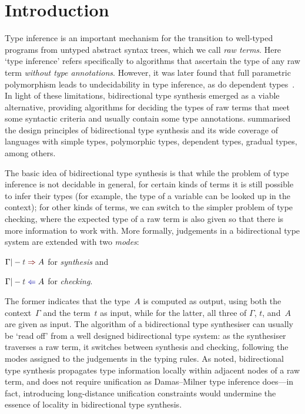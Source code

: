 
\section{Introduction}\label{sec:intro}

Type inference is an important mechanism for the transition to well-typed programs from untyped abstract syntax trees, which we call \emph{raw terms}.
Here `type inference' refers specifically to algorithms that ascertain the type of any raw term \emph{without type annotations}.
However, it was later found that full parametric polymorphism leads to undecidability in type inference, as do dependent types~\citep{Wells1999,Dowek1993}.
In light of these limitations, bidirectional type synthesis emerged as a viable alternative, providing algorithms for deciding the types of raw terms that meet some syntactic criteria and usually contain some type annotations.
\citet{Dunfield2021} summarised the design principles of bidirectional type synthesis and its wide coverage of languages with simple types, polymorphic types, dependent types, gradual types, among others.

The basic idea of bidirectional type synthesis is that while the problem of type inference is not decidable in general, for certain kinds of terms it is still possible to infer their types (for example, the type of a variable can be looked up in the context); for other kinds of terms, we can switch to the simpler problem of type checking, where the expected type of a raw term is also given so that there is more information to work with.
More formally, judgements in a bidirectional type system are extended with two \emph{modes}:
\begin{enumerate*}
  \item $\Gamma |- \isTerm{t} \syn A$ for \emph{synthesis} and 
  \item $\Gamma |- \isTerm{t} \chk A$ for \emph{checking}.
\end{enumerate*}
The former indicates that the type~$A$ is computed as output, using both the context~$\Gamma$ and the term~$t$ as input, while for the latter, all three of $\Gamma$, $t$, and~$A$ are given as input.
The algorithm of a bidirectional type synthesiser can usually be `read off' from a well designed bidirectional type system: as the synthesiser traverses a raw term, it switches between synthesis and checking, following the modes assigned to the judgements in the typing rules.
As \citet{Pierce2000} noted, bidirectional type synthesis propagates type information locally within adjacent nodes of a raw term, and does not require unification as Damas--Milner type inference does---in fact, introducing long-distance unification constraints would undermine the essence of locality in bidirectional type synthesis.

